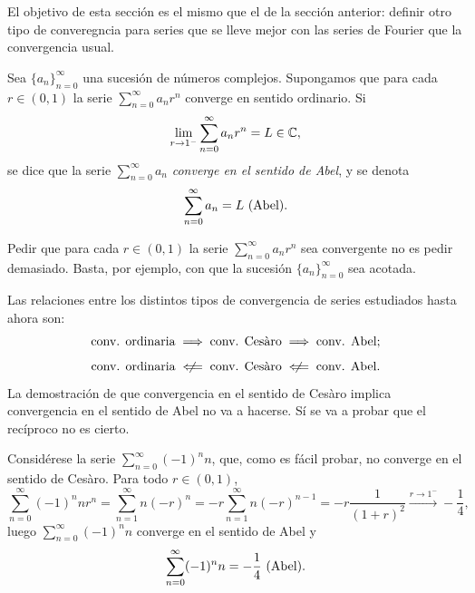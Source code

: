 \documentclass[a4paper, 11pt, oneside]{report}
\begin{document}
El objetivo de esta sección es el mismo que el de la sección anterior: definir otro tipo de converegncia para series que se lleve mejor con las series de Fourier que la convergencia usual.

\begin{definition}
  Sea $\{a_n\}_{n=0}^\infty$ una sucesión de números complejos. Supongamos que para cada $r \in (0,1)$ la serie $\sum_{n=0}^\infty a_nr^n$ converge en sentido ordinario. Si
  \[\lim_{r \to 1^-} \sum_{n=0}^\infty a_nr^n = L \in \mathbb C, \]
  se dice que la serie $\sum_{n=0}^\infty a_n$ \emph{converge en el sentido de Abel}, y se denota
  \[\sum_{n=0}^\infty a_n = L\ (\textup{Abel}).\]
\end{definition}

Pedir que para cada $r\in(0,1)$ la serie $\sum_{n=0}^\infty a_nr^n$ sea convergente no es pedir demasiado. Basta, por ejemplo, con que la sucesión $\{a_n\}_{n=0}^\infty$ sea acotada.

Las relaciones entre los distintos tipos de convergencia de series estudiados hasta ahora son:
\[\textup{conv. ordinaria} \implies \textup{conv. Cesàro} \implies \textup{conv. Abel};\]
\[\textup{conv. ordinaria} \centernot\impliedby \textup{conv. Cesàro} \centernot\impliedby \textup{conv. Abel}.\]
La demostración de que convergencia en el sentido de Cesàro implica convergencia en el sentido de Abel no va a hacerse. Sí se va a probar que el recíproco no es cierto.

\begin{example}
  Considérese la serie $\sum_{n=0}^\infty (-1)^n n$, que, como es fácil probar, no converge en el sentido de Cesàro. Para todo $r \in (0,1)$,
  \[\sum_{n=0}^\infty (-1)^n nr^n = \sum_{n=1}^\infty n(-r)^n = -r\sum_{n=1}^\infty n(-r)^{n-1} = -r \frac{1}{(1+r)^2} \xrightarrow{r \to 1^-} -\frac{1}{4},\]
  luego $\sum_{n=0}^\infty (-1)^n n$ converge en el sentido de Abel y
  \[\sum_{n=0}^\infty (-1)^n n = -\frac{1}{4} \ (\textup{Abel}).\]
\end{example}
\end{document}
